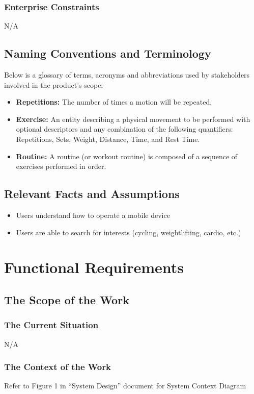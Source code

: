 \documentclass[12pt]{article}
\begin{document}
\subsubsection{Enterprise Constraints}
N/A

\subsection{Naming Conventions and Terminology}
Below is a glossary of terms, acronyms and abbreviations used by stakeholders involved in the product's scope:
\begin{itemize}
	\item \textbf{Repetitions: } The number of times a motion will be repeated.
	\item \textbf{Exercise: } An entity describing a physical movement to be performed with optional descriptors and any combination of the following quantifiers: Repetitions, Sets, Weight, Distance, Time, and Rest Time. 
	\item \textbf{Routine: } A routine (or workout routine) is composed of a sequence of exercises performed in order.
\end{itemize}
\subsection{Relevant Facts and Assumptions}
\begin{itemize}
	\item Users understand how to operate a mobile device
	\item Users are able to search for interests (cycling, weightlifting, cardio, etc.)
\end{itemize}
\section{Functional Requirements}
\subsection{The Scope of the Work}
\subsubsection{The Current Situation}
N/A
\subsubsection{The Context of the Work}
Refer to Figure 1 in ``System Design'' document for System Context Diagram
\end{document}
